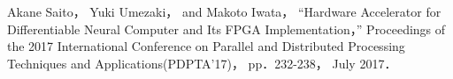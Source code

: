 \documentclass[a4j]{jarticle}
\begin{document}
\begin{Abstract}
\begin{thebibliography}{99}
  Akane Saito， Yuki Umezaki， and Makoto Iwata， ``Hardware Accelerator for Differentiable Neural Computer and Its FPGA Implementation，'' Proceedings of the 2017 International Conference on Parallel and Distributed Processing Techniques and Applications(PDPTA'17)， pp．232-238， July 2017．
\end{thebibliography}

\end{Abstract}
\end{document}

